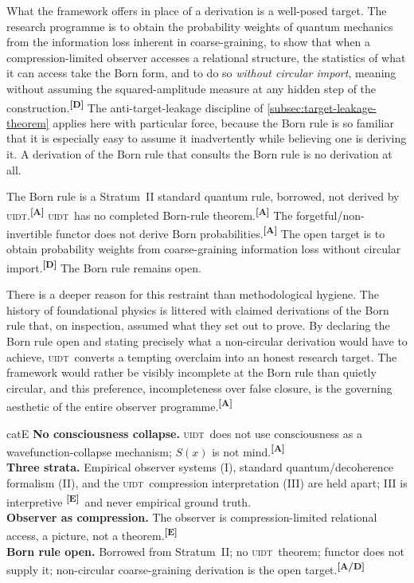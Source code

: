 \documentclass[12pt,a4paper,twoside]{article}
\theoremstyle{plain}
\theoremstyle{definition}
\theoremstyle{remark}
\newcommand{\UIDT}{\textsc{uidt}}
\newcommand{\catmark}[1]{\textsuperscript{\textsf{\textbf{[#1]}}}}
\begin{document}
What the framework offers in place of a derivation is a well-posed target. The research programme is to obtain the probability weights of quantum mechanics from the information loss inherent in coarse-graining, to show that when a compression-limited observer accesses a relational structure, the statistics of what it can access take the Born form, and to do so \emph{without circular import}, meaning without assuming the squared-amplitude measure at any hidden step of the construction.\catmark{D} The anti-target-leakage discipline of \cref{subsec:target-leakage-theorem} applies here with particular force, because the Born rule is so familiar that it is especially easy to assume it inadvertently while believing one is deriving it. A derivation of the Born rule that consults the Born rule is no derivation at all.

\begin{governancebox}
The Born rule is a Stratum~II standard quantum rule, borrowed, not derived by \UIDT.\catmark{A} \UIDT\ has no completed Born-rule theorem.\catmark{A} The forgetful/non-invertible functor does not derive Born probabilities.\catmark{A} The open target is to obtain probability weights from coarse-graining information loss without circular import.\catmark{D} The Born rule remains open.
\end{governancebox}

\noindent There is a deeper reason for this restraint than methodological hygiene. The history of foundational physics is littered with claimed derivations of the Born rule that, on inspection, assumed what they set out to prove. By declaring the Born rule open and stating precisely what a non-circular derivation would have to achieve, \UIDT\ converts a tempting overclaim into an honest research target. The framework would rather be visibly incomplete at the Born rule than quietly circular, and this preference, incompleteness over false closure, is the governing aesthetic of the entire observer programme.\catmark{A}

\begin{evidencebox}{catE}
\textbf{No consciousness collapse.} \UIDT\ does not use consciousness as a
wavefunction-collapse mechanism; $S(x)$ is not mind.\catmark{A}\\[0.3em]
\textbf{Three strata.} Empirical observer systems (I), standard quantum/decoherence formalism (II), and the \UIDT\ compression interpretation (III) are held apart; III is interpretive \catmark{E}\ and never empirical
ground truth.\\[0.3em]
\textbf{Observer as compression.} The observer is compression-limited relational
access, a picture, not a theorem.\catmark{E}\\[0.3em]
\textbf{Born rule open.} Borrowed from Stratum~II; no \UIDT\ theorem; functor does not supply it; non-circular coarse-graining derivation is the open target.\catmark{A/D}
\end{evidencebox}
\end{document}
